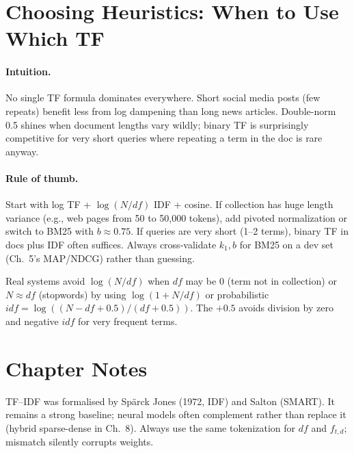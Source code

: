 \section{Choosing Heuristics: When to Use Which TF}\label{sec:heuristics}
\paragraph{Intuition.} No single TF formula dominates everywhere. Short social media posts (few repeats) benefit less from log dampening than long news articles. Double-norm 0.5 shines when document lengths vary wildly; binary TF is surprisingly competitive for very short queries where repeating a term in the doc is rare anyway.

\paragraph{Rule of thumb.} Start with log TF + $\log(N/df)$ IDF + cosine. If collection has huge length variance (e.g., web pages from 50 to 50,000 tokens), add pivoted normalization or switch to BM25 with $b\approx0.75$. If queries are very short (1--2 terms), binary TF in docs plus IDF often suffices. Always cross-validate $k_1,b$ for BM25 on a dev set (Ch.~5's MAP/NDCG) rather than guessing.

\begin{remark}
Real systems avoid $\log(N/df)$ when $df$ may be $0$ (term not in collection) or $N\approx df$ (stopwords) by using $\log(1+N/df)$ or probabilistic $idf=\log((N-df+0.5)/(df+0.5))$. The $+0.5$ avoids division by zero and negative $idf$ for very frequent terms.
\end{remark}

\section{Chapter Notes}
TF--IDF was formalised by Sp\"arck Jones (1972, IDF) and Salton (SMART). It remains a strong baseline; neural models often complement rather than replace it (hybrid sparse-dense in Ch.~8). Always use the same tokenization for $df$ and $f_{t,d}$; mismatch silently corrupts weights.

